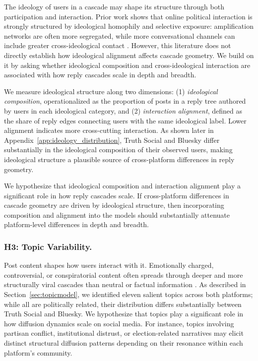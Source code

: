 \documentclass[letterpaper]{article} %
\newcommand{\rev}[1]{{\color{blue}#1}}
\begin{document}
The ideology of users in a cascade may shape its structure through both participation and interaction. Prior work shows that online political interaction is strongly structured by ideological homophily and selective exposure: amplification networks are often more segregated, while more conversational channels can include greater cross-ideological contact \cite{conover_political_2011, garimella_political_2018, barbera_tweeting_2015, adamic_political_2005, guess_how_2023}. However, this literature does not directly establish how ideological alignment affects cascade geometry. We build on it by asking whether ideological composition and cross-ideological interaction are associated with how reply cascades scale in depth and breadth.

We measure ideological structure along two dimensions: (1) \textit{ideological composition}, \rev{operationalized as the proportion of posts in a reply tree authored by users in each ideological category}, and (2) \textit{interaction alignment}, defined as the share of reply edges connecting users with the same ideological label. Lower alignment indicates more cross-cutting interaction. As shown later in Appendix~\ref{app:ideology_distribution}, Truth Social and Bluesky differ substantially in the ideological composition of their observed users, making ideological structure a plausible source of cross-platform differences in reply geometry.

We hypothesize that ideological composition and interaction alignment play a significant role in how reply cascades scale. If cross-platform differences in cascade geometry are driven by ideological structure, then incorporating composition and alignment into the models should substantially attenuate platform-level differences in depth and breadth.

\subsubsection{H3: Topic Variability.}
Post content shapes how users interact with it. Emotionally charged, controversial, or conspiratorial content often spreads through deeper and more structurally viral cascades than neutral or factual information \cite{vosoughi_spread_2018}. As described in Section~\ref{sec:topicmodel}, we identified eleven salient topics across both platforms; while all are politically related, their distribution differs substantially between Truth Social and Bluesky. We hypothesize that topics play a significant role in how diffusion dynamics scale on social media. For instance, topics involving partisan conflict, institutional distrust, or election-related narratives may elicit distinct structural diffusion patterns depending on their resonance within each platform's community. 
\end{document}
